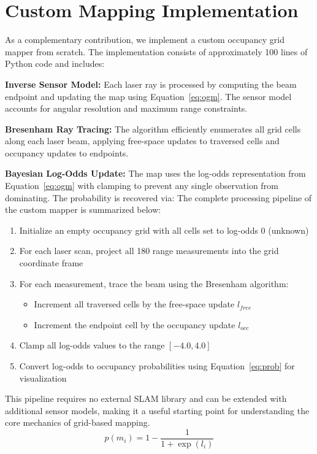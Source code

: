 \documentclass[conference]{IEEEtran}
\begin{document}
  \section{Custom Mapping Implementation}

  As a complementary contribution, we implement a custom occupancy grid mapper from scratch. The
  implementation consists of approximately 100 lines of Python code and includes:

  \textbf{Inverse Sensor Model:} Each laser ray is processed by computing the beam endpoint and updating
  the map using Equation~\ref{eq:ogm}. The sensor model accounts for angular resolution and maximum range
  constraints.

  \textbf{Bresenham Ray Tracing:} The algorithm efficiently enumerates all grid cells along each laser
  beam, applying free-space updates to traversed cells and occupancy updates to endpoints.

  \textbf{Bayesian Log-Odds Update:} The map uses the log-odds representation from Equation~\ref{eq:ogm}
  with clamping to prevent any single observation from dominating. The probability is recovered via:
    The complete processing pipeline of the custom mapper is summarized below:

  \begin{enumerate}
      \item Initialize an empty occupancy grid with all cells set to log-odds 0 (unknown)
      \item For each laser scan, project all 180 range measurements into the grid coordinate frame
      \item For each measurement, trace the beam using the Bresenham algorithm:
          \begin{itemize}
              \item Increment all traversed cells by the free-space update $l_{free}$
              \item Increment the endpoint cell by the occupancy update $l_{occ}$
          \end{itemize}
      \item Clamp all log-odds values to the range $[-4.0, 4.0]$
      \item Convert log-odds to occupancy probabilities using Equation~\ref{eq:prob} for visualization
  \end{enumerate}

  This pipeline requires no external SLAM library and can be extended with additional sensor models,
  making it a useful starting point for understanding the core mechanics of grid-based mapping.
  \begin{equation}
  p(m_i) = 1 - \frac{1}{1 + \exp(l_i)}
  \label{eq:prob}
  \end{equation}
\end{document}
